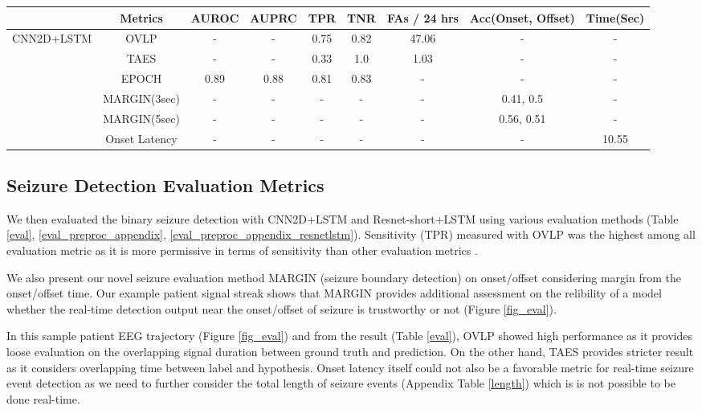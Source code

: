 \documentclass[pmlr,twocolumn,10pt]{jmlr}
\begin{document}
\begin{table*}[ht!]
	\footnotesize
	\centering
	\caption{Exploration on four evaluation methods on real-time seizure detection with CNN2D+LSTM, average over 5 runs. We selected TPR, TNR and FAs/24hours that maximizes TPR + TNR, and selected MARGIN and Onset Latency when TNR is above 0.95.}
\label{eval}
	\begin{tabular}{c|c|ccccccc}
		\toprule
		& Metrics & AUROC & AUPRC & TPR & TNR & FAs / 24 hrs & Acc(Onset, Offset) & Time(Sec)\\
		\midrule
		\multirow{6}{*}{CNN2D+LSTM} 
& OVLP & - & - & 0.75 & 0.82 & 47.06 & - & - \\
		& TAES & - & - & 0.33 & 1.0 & 1.03 & - & - \\
		& EPOCH & 0.89 & 0.88 & 0.81 & 0.83 & - & - & - \\
		& MARGIN(3sec)  & - & - & - & - & - & 0.41, 0.5 & - \\
		& MARGIN(5sec) & - & - & - & - & - & 0.56, 0.51 & - \\
		& Onset Latency & - & - & - & - & - & - & 10.55 \\
\bottomrule
	\end{tabular}
\end{table*}
 \subsection{Seizure Detection Evaluation Metrics}
We then evaluated the binary seizure detection with CNN2D+LSTM and Resnet-short+LSTM using various evaluation methods (Table \ref{eval}, \ref{eval_preproc_appendix}, \ref{eval_preproc_appendix_resnetlstm}). Sensitivity (TPR) measured with OVLP was the highest among all evaluation metric as it is more permissive in terms of sensitivity than other evaluation metrics \citep{ziyabari2017objective}.

We also present our novel seizure evaluation method MARGIN (seizure boundary detection) on onset/offset considering margin from the onset/offset time. Our example patient signal streak shows that MARGIN provides additional assessment on the relibility of a model whether the real-time detection output near the onset/offset of seizure is trustworthy or not (Figure \ref{fig_eval}). 

In this sample patient EEG trajectory (Figure \ref{fig_eval}) and from the result (Table \ref{eval}), OVLP showed high performance as it provides loose evaluation on the overlapping signal duration between ground truth and prediction. On the other hand, TAES provides stricter result as it considers overlapping time between label and hypothesis. Onset latency itself could not also be a favorable metric for real-time seizure event detection as we need to further consider the total length of seizure events (Appendix Table \ref{length}) which is is not possible to be done real-time.
\end{document}
